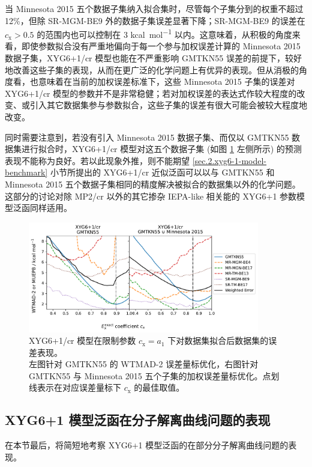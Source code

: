 当 Minnesota 2015 五个数据子集纳入拟合集时，尽管每个子集分到的权重不超过 12\%，但除 SR-MGM-BE9 外的数据子集误差显著下降；SR-MGM-BE9 的误差在 $c_\mathrm{x} > 0.5$ 的范围内也可以控制在 3 \si{kcal.mol^{-1}} 以内。这意味着，从积极的角度来看，即使参数拟合没有严重地偏向于每一个参与加权误差计算的 Minnesota 2015 数据子集，XYG6+1/cr 模型也能在不严重影响 GMTKN55 误差的前提下，较好地改善这些子集的表现，从而在更广泛的化学问题上有优异的表现。但从消极的角度看，也意味着在当前的加权误差标准下，这些 Minnesota 2015 子集的误差对 XYG6+1/cr 模型的参数并不是非常稳健；若对加权误差的表达式作较大程度的改变、或引入其它数据集参与参数拟合，这些子集的误差有很大可能会被较大程度地改变。

同时需要注意到，若没有引入 Minnesota 2015 数据子集、而仅以 GMTKN55 数据集进行拟合时，XYG6+1/cr 模型对这五个数据子集 (如图 \ref{fig.2.plot-seq-xyg7} 左侧所示) 的预测表现不能称为良好。若以此现象外推，则不能期望 \ref{sec.2.xyg6-1-model-benchmark} 小节所提出的 XYG6+1/cr 近似泛函可以以与 GMTKN55 和 Minnesota 2015 五个数据子集相同的精度解决被拟合的数据集以外的化学问题。这部分的讨论对除 MP2/cr 以外的其它掺杂 IEPA-like 相关能的 XYG6+1 参数模型泛函同样适用。

\begin{figure}[h]
  \centering
  \includegraphics[width=0.9\textwidth]{assets/plot-seq-cr.pdf}
  \caption{XYG6+1/cr 模型在限制参数 $c_\mathrm{x} = a_1$ 下对数据集拟合后数据集的误差表现。\\左图针对 GMTKN55 的 WTMAD-2 误差量标优化，右图针对 GMTKN55 与 Minnesota 2015 五个子集的加权误差量标优化。点划线表示在对应误差量标下 $c_\mathrm{x}$ 的最佳取值。}
  \label{fig.2.plot-seq-xyg7}
\end{figure}

\subsection{XYG6+1 模型泛函在分子解离曲线问题的表现}

在本节最后，将简短地考察 XYG6+1 模型泛函的在部分分子解离曲线问题的表现。

